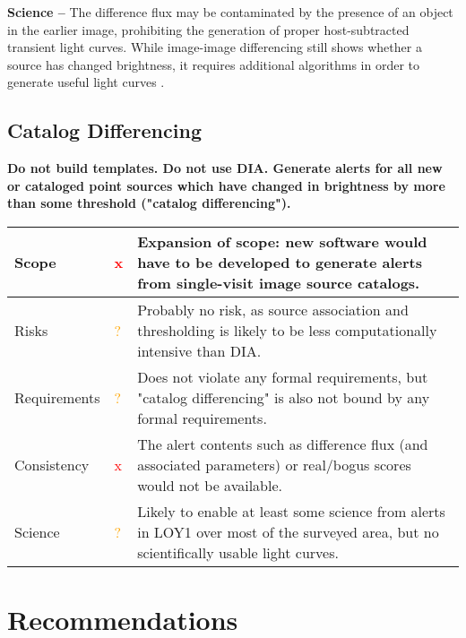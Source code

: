 \documentclass[DM,lsstdraft,toc]{lsstdoc}
\begin{document}
{\bf Science --} The difference flux may be contaminated by the presence of an object in the earlier image, prohibiting the generation of proper host-subtracted transient light curves. While image-image differencing still shows whether a source has changed brightness, it requires additional algorithms in order to generate useful light curves \citep[e.g.,][]{2005AJ....130.2272B}.


\subsection{Catalog Differencing}

{\bf Do not build templates. Do not use DIA. Generate alerts for all new or cataloged point sources which have changed in brightness by more than some threshold ("catalog differencing").}

\begin{center}
\begin{tabular}{|p{2.5cm}|p{0.3cm}|p{13cm}|}
\hline
Scope & \textcolor{red}{x} & Expansion of scope: new software would have to be developed to generate alerts from single-visit image source catalogs. \\
\hline
Risks & \textcolor{orange}{?} & Probably no risk, as source association and thresholding is likely to be less computationally intensive than DIA. \\
\hline
Requirements & \textcolor{orange}{?} & Does not violate any formal requirements, but "catalog differencing" is also not bound by any formal requirements. \\
\hline
Consistency & \textcolor{red}{x} & The alert contents such as difference flux (and associated parameters) or real/bogus scores would not be available. \\
\hline
Science & \textcolor{orange}{?} & Likely to enable at least some science from alerts in LOY1 over most of the surveyed area, but no scientifically usable light curves. \\
\hline
\end{tabular}
\end{center}



\section{Recommendations}\label{sec:rec}
\end{document}
